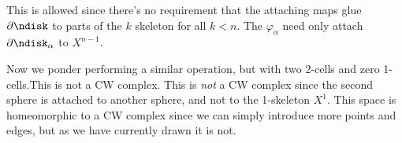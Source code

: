     \par\vspace{2.5ex}
    This is allowed since there's no requirement that the attaching
    maps glue $\partial\ndisk$ to parts of the $k$ skeleton for all
    $k<n$. The $\varphi_{\alpha}$ need only attach
    $\partial\ndisk_{\alpha}$ to $X^{n-1}$.
    \par\hfill\par
    \begin{minipage}[t]{0.56\textwidth}
        Now we ponder performing a similar operation, but with two
        2-cells and zero 1-cells.This is not a CW complex. This is
        \textit{not} a CW complex since the second sphere is attached
        to another sphere, and not to the 1-skeleton $X^{1}$. This space
        is homeomorphic to a CW complex since we can simply introduce
        more points and edges, but as we have currently drawn it is not.
    \end{minipage}
    \hfill
